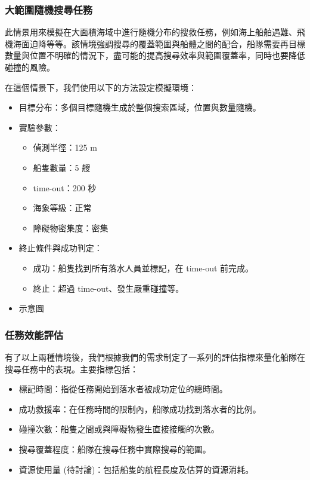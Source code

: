 \documentclass[12pt,a4paper]{article}
\begin{document}
\subsubsection{大範圍隨機搜尋任務}
此情景用來模擬在大面積海域中進行隨機分布的搜救任務，例如海上船舶遇難、飛機海面迫降等等。該情境強調搜尋的覆蓋範圍與船體之間的配合，船隊需要再目標數量與位置不明確的情況下，盡可能的提高搜尋效率與範圍覆蓋率，同時也要降低碰撞的風險。
\\ \par
在這個情景下，我們使用以下的方法設定模擬環境：
\begin{itemize}
    \item 目標分布：多個目標隨機生成於整個搜索區域，位置與數量隨機。
    \item 實驗參數：
    \begin{itemize}
        \item 偵測半徑：125 m
        \item 船隻數量：5 艘
        \item time-out：200 秒
        \item 海象等級：正常
        \item 障礙物密集度：密集
    \end{itemize}
    \item 終止條件與成功判定：
    \begin{itemize}
        \item 成功：船隻找到所有落水人員並標記，在 time-out 前完成。
        \item 終止：超過 time-out、發生嚴重碰撞等。
    \end{itemize}
    \item 示意圖
\end{itemize}

\subsubsection{任務效能評估}
有了以上兩種情境後，我們根據我們的需求制定了一系列的評估指標來量化船隊在搜尋任務中的表現。主要指標包括：
\begin{itemize}
    \item 標記時間：指從任務開始到落水者被成功定位的總時間。
    \item 成功救援率：在任務時間的限制內，船隊成功找到落水者的比例。
    \item 碰撞次數：船隻之間或與障礙物發生直接接觸的次數。
    \item 搜尋覆蓋程度：船隊在搜尋任務中實際搜尋的範圍。
    \item 資源使用量 (待討論)：包括船隻的航程長度及估算的資源消耗。
\end{itemize}
\end{document}
